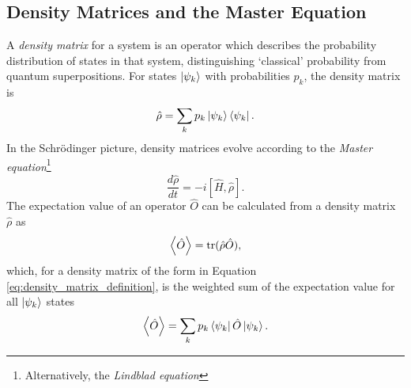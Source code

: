 \subsection{Density Matrices and the Master Equation}
A \textit{density matrix}\cite{breuer_book} for a system is an operator which describes the probability distribution of states in that system, distinguishing `classical' probability from quantum superpositions. For states $\left|\psi_k\right\rangle$ with probabilities $p_k$, the density matrix is
\begin{equation}
    \hat{\rho} = \sum_k p_k \left|\psi_k\right\rangle\left\langle\psi_k\right|. \label{eq:density_matrix_definition}
\end{equation}
In the Schr\"{o}dinger picture, density matrices evolve according to the \textit{Master equation}\footnote{Alternatively, the \textit{Lindblad equation}}
\begin{equation}
    \frac{d\hat{\rho}}{dt} = -i[\hat{H}, \hat{\rho}].
\end{equation}
The expectation value of an operator $\hat{O}$ can be calculated from a density matrix $\hat{\rho}$ as
\begin{equation}
    \left\langle{\hat{O}}\right\rangle = \operatorname{tr}(\hat{\rho}\hat{O}), \label{eq:density_matrix_expectation_value}
\end{equation}
which, for a density matrix of the form in Equation \ref{eq:density_matrix_definition}, is the weighted sum of the expectation value for all $\left|\psi_k\right\rangle$ states
\begin{equation}
    \left\langle{\hat{O}}\right\rangle = \sum_k p_k \left\langle\psi_k\right|\hat{O}\left|\psi_k\right\rangle.
\end{equation}

